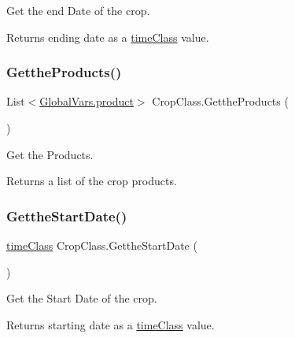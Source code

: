 Get the end Date of the crop. 

\begin{DoxyReturn}{Returns}
ending date as a \mbox{\hyperlink{classtime_class}{time\+Class}} value. 
\end{DoxyReturn}
\mbox{\label{class_crop_class_a080b41c202c94069edf623266ff89555}} 
\subsubsection{\texorpdfstring{GettheProducts()}{GettheProducts()}}
{\footnotesize\ttfamily List$<$\mbox{\hyperlink{class_global_vars_1_1product}{Global\+Vars.\+product}}$>$ Crop\+Class.\+Getthe\+Products (\begin{DoxyParamCaption}{ }\end{DoxyParamCaption})\hspace{0.3cm}{\ttfamily [inline]}}



Get the Products. 

\begin{DoxyReturn}{Returns}
a list of the crop products. 
\end{DoxyReturn}
\mbox{\label{class_crop_class_aaa4a4eaf4aad0fd117c7d5f3c9f773a1}} 
\subsubsection{\texorpdfstring{GettheStartDate()}{GettheStartDate()}}
{\footnotesize\ttfamily \mbox{\hyperlink{classtime_class}{time\+Class}} Crop\+Class.\+Getthe\+Start\+Date (\begin{DoxyParamCaption}{ }\end{DoxyParamCaption})\hspace{0.3cm}{\ttfamily [inline]}}



Get the Start Date of the crop. 

\begin{DoxyReturn}{Returns}
starting date as a \mbox{\hyperlink{classtime_class}{time\+Class}} value. 
\end{DoxyReturn}
\mbox{\label{class_crop_class_a7c2f742609fe3425409395df0f8ea450}} 
